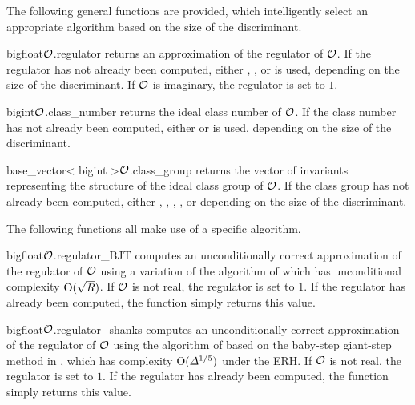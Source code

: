 The following general functions are provided, which intelligently select an appropriate
algorithm based on the size of the discriminant.

\begin{fcode}{bigfloat}{$\mathcal{O}$.regulator}{}
  returns an approximation of the regulator of $\mathcal{O}$.  If the regulator has not already been
  computed, either , , or  is
  used, depending on the size of the discriminant.  If $\mathcal{O}$ is imaginary, the regulator is set
  to $1$.
\end{fcode}

\begin{fcode}{bigint}{$\mathcal{O}$.class_number}{}
  returns the ideal class number of $\mathcal{O}$.  If the class number has not already been computed,
  either  or  is used, depending on the size
  of the discriminant.
\end{fcode}

\begin{fcode}{base_vector< bigint >}{$\mathcal{O}$.class_group}{}
  returns the vector of invariants representing the structure of the ideal class group of $\mathcal{O}$.
  If the class group has not already been computed, either ,
  , , , or
   depending on the size of the discriminant.
\end{fcode}

The following functions all make use of a specific algorithm.

\begin{fcode}{bigfloat}{$\mathcal{O}$.regulator_BJT}{}
  computes an unconditionally correct approximation of the regulator of $\mathcal{O}$ using a variation
  of the algorithm of \cite{Biehl/Buchmann:1995} which has unconditional complexity
  $\mathrm{O}(\sqrt{R})$.  If $\mathcal{O}$ is not real, the regulator is set to $1$.  If the regulator
  has already been computed, the function simply returns this value.
\end{fcode}

\begin{fcode}{bigfloat}{$\mathcal{O}$.regulator_shanks}{}
  computes an unconditionally correct approximation of the regulator of $\mathcal{O}$ using the
  algorithm of \cite{Jacobson/Lukes/Williams:1995} based on the baby-step giant-step method in
  \cite{Mollin/Williams:1992}, which has complexity $\mathrm{O}(\varDelta ^{1/5})$ under the ERH.  If
  $\mathcal{O}$ is not real, the regulator is set to $1$.  If the regulator has already been computed,
  the function simply returns this value.
\end{fcode}

